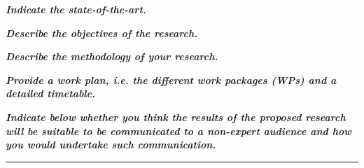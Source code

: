 \documentclass[11pt,a4paper]{article}
\begin{document}
\begin{center}  
\textbf{\textit{{\Large Indicate the state-of-the-art.}}}\\
\end{center}



\begin{center}
\textbf{\textit{{\Large Describe the objectives of the research.}}}\\
\end{center}


\begin{center}
\textbf{\textit{{\Large Describe the methodology of your research.}}}\\
\end{center}


\begin{center}
\textbf{\textit{{\Large Provide a work plan, i.e. the different work packages (WPs) and a detailed timetable.}}}\\
\end{center}


\begin{center}
\textbf{\textit{{\Large Indicate below whether you think the results of the proposed research will be suitable to be communicated to a non-expert audience and how you would undertake such communication.}}}\\
\end{center}


%


\vspace{5pt}
\hrule
\vspace{5pt}


%
\end{document}
